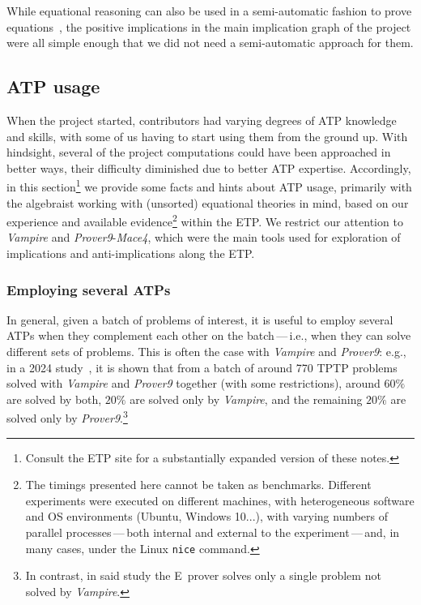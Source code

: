 
While equational reasoning can also be used in a semi-automatic fashion to prove equations~\cite{DBLP:journals/pacmpl/KoehlerGBGTS24}, the positive implications in the main implication graph of the project were all simple enough that we did not need a semi-automatic approach for them.

\subsection{ATP usage}\label{ATP_usage}

When the project started, contributors had varying degrees of ATP knowledge and skills, with some of us having to start using them from the ground up. With hindsight, several of the project computations could have been approached in better ways, their difficulty diminished due to better ATP expertise. Accordingly, in this section\footnote{Consult the ETP site for a substantially expanded version of these notes.} we provide some facts and hints about ATP usage, primarily with the algebraist working with (unsorted) equational theories in mind, based on our experience and available evidence\footnote{The timings presented here cannot be taken as benchmarks. Different experiments were executed on different machines, with heterogeneous software and OS environments (Ubuntu, Windows 10...), with varying numbers of parallel processes\,---\,both internal and external to the experiment\,---\,and, in many cases, under the Linux \Verb|nice| command.} within the ETP\@. We restrict our attention to \emph{Vampire} and \emph{Prover9}-\emph{Mace4}, which were the main tools used for exploration of implications and anti-implications along the ETP\@.

\subsubsection{Employing several ATPs}
In general, given a batch of problems of interest, it is useful to employ several ATPs when they complement each other on the batch\,---\,i.e., when they can solve different sets of problems. This is often the case with \emph{Vampire} and \emph{Prover9}: e.g., in a 2024 study~\cite{LPAR2024:Prover9_Unleashed_Automated_Configuration}, it is shown that from a batch of around 770 TPTP problems solved with \emph{Vampire} and \emph{Prover9} together (with some restrictions), around $60\%$ are solved by both, $20\%$ are solved only by \emph{Vampire}, and the remaining $20\%$ are solved only by \emph{Prover9}.\footnote{In contrast, in said study the E~prover solves only a single problem not solved by \emph{Vampire}.}

